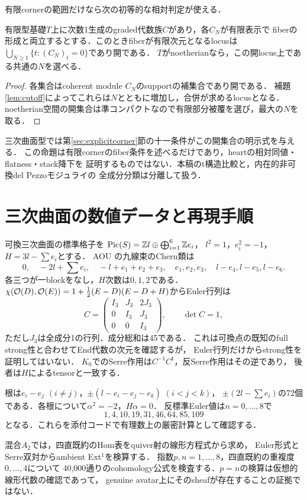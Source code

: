 有限cornerの範囲だけなら次の初等的な相対判定が使える．
\begin{proposition}\label{prop:relativecorner}
有限型基礎$T$上に次数1生成のgraded代数族$C$があり，各$C_N$が有限表示で
fiberの形成と両立するとする．このときfiberが有限次元となるlocusは
$\bigcup_{N\ge1}\{t:(C_N)_t=0\}$であり開である．
$T$がnoetherianなら，この開locus上である共通の$N$を選べる．
\end{proposition}
\begin{proof}
各集合はcoherent module $C_N$のsupportの補集合であり開である．
補題\ref{lem:cutoff}によってこれらは$N$とともに増加し，合併が求めるlocusとなる．
noetherian空間の開集合は準コンパクトなので有限部分被覆を選び，最大の$N$を取る．
\end{proof}
三次曲面型では第\ref{sec:explicitcorner}節の十一条件がこの開集合の明示式を与える．
この命題は有限cornerのfiber条件を述べるだけであり，heartの相対同値・flatness・stack降下を
証明するものではない．本稿のt構造比較と，内在的非可換del Pezzoモジュライの
全成分分類は分離して扱う．

\appendix
\section{三次曲面の数値データと再現手順}\label{app:numerics}
可換三次曲面の標準格子を
$\operatorname{Pic}(S)=\mathbb Zl\oplus\bigoplus_{i=1}^6\mathbb Ze_i$，
$l^2=1$，$e_i^2=-1$，$H=3l-\sum e_i$とする．
AOU \cite[(4.1)]{AOU}の九線束のChern類は
\[
0,\quad -2l+\sum e_i,\quad -l+e_1+e_2+e_3,
\quad e_1,e_2,e_3,\quad l-e_4,l-e_5,l-e_6.
\]
各三つが一blockをなし，$H$次数は$0,1,2$である．
$\chi(\mathcal O(D),\mathcal O(E))=1+\tfrac12(E-D)(E-D+H)$からEuler行列は
\[
C=\begin{pmatrix}I_3&J_3&2J_3\\0&I_3&J_3\\0&0&I_3\end{pmatrix},
\qquad \det C=1,
\]
ただし$J_3$は全成分1の行列．成分総和は45である．
これは可換点の既知のfull strong性と合わせてEnd代数の次元を確認するが，
Euler行列だけからstrong性を証明してはいない．
$K_0$でのSerre作用は$C^{-1}C^{\mathsf t}$，反Serre作用はその逆であり，
後者は$H$によるtensorと一致する．

根は$e_i-e_j$ $(i\ne j)$，$\pm(l-e_i-e_j-e_k)$ $(i<j<k)$，
$\pm(2l-\sum e_i)$の72個である．各根について$\alpha^2=-2$，$H\alpha=0$．
反標準Euler値は$n=0,\ldots,8$で
\[
1,4,10,19,31,46,64,85,109
\]
となる．これらを添付コードで有理数上の厳密計算として確認する．

混合$A_2$では，四直既約のHom表をquiver射の線形方程式から求め，
Euler形式とSerre双対からambient Ext$^1$を検算する．
指数$p,n=1,\ldots,8$，四直既約の重複度$0,\ldots,4$について
40,000通りのcohomology公式を検査する．$p=n$の検算は仮想的線形代数の確認であって，
genuine avatar上にそのsheafが存在することの証拠ではない．

